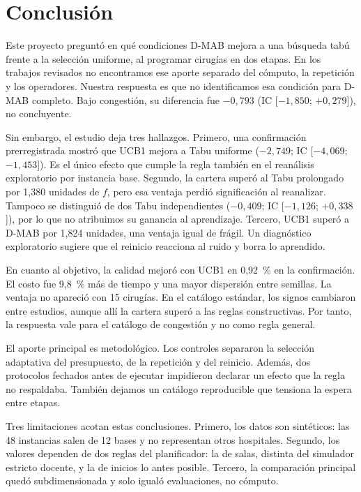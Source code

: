%   
\section{Conclusión}
\label{sec:conclusion}\label{con-ini}

Este proyecto preguntó en qué condiciones D-MAB mejora a una búsqueda tabú frente a
la selección uniforme, al programar cirugías en dos etapas. En los trabajos revisados
no encontramos ese aporte separado del cómputo, la repetición y los operadores.
Nuestra respuesta es que no identificamos esa condición para D-MAB completo. Bajo
congestión, su diferencia fue $-0{,}793$ (IC [$-1{,}850$; $+0{,}279$]), no concluyente.

Sin embargo, el estudio deja tres hallazgos. Primero, una confirmación prerregistrada
mostró que UCB1 mejora a Tabu uniforme ($-2{,}749$; IC [$-4{,}069$; $-1{,}453$]). Es el
único efecto que cumple la regla también en el reanálisis exploratorio por instancia
base. Segundo, la cartera superó al Tabu prolongado por 1,380 unidades de $f$, pero esa
ventaja perdió significación al reanalizar. Tampoco se distinguió de dos Tabu
independientes ($-0{,}409$; IC [$-1{,}126$; $+0{,}338$]), por lo que no atribuimos su
ganancia al aprendizaje. Tercero, UCB1 superó a D-MAB por 1,824 unidades, una ventaja
igual de frágil. Un diagnóstico exploratorio sugiere que el reinicio reacciona al ruido
y borra lo aprendido.

En cuanto al objetivo, la calidad mejoró con UCB1 en 0,92~\% en la confirmación. El costo
fue 9,8~\% más de tiempo y una mayor dispersión entre semillas. La ventaja no apareció con
15 cirugías. En el catálogo estándar, los signos cambiaron entre estudios, aunque allí la cartera superó
a las reglas constructivas.
Por tanto, la respuesta vale para el catálogo de congestión y no como regla general.

El aporte principal es metodológico. Los controles separaron la selección adaptativa
del presupuesto, de la repetición y del reinicio. Además, dos protocolos fechados antes
de ejecutar impidieron declarar un efecto que la regla no respaldaba. También dejamos
un catálogo reproducible que tensiona la espera entre etapas.

Tres limitaciones acotan estas conclusiones. Primero, los datos son sintéticos: las 48
instancias salen de 12 bases y no representan otros hospitales. Segundo, los valores
dependen de dos reglas del planificador: la de salas, distinta del simulador estricto
docente, y la de inicios lo antes posible. Tercero, la comparación principal quedó subdimensionada y solo igualó
evaluaciones, no cómputo.


